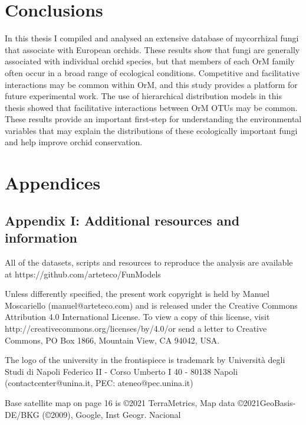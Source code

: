 \part{Conclusions}
\label{conclusions}

In this thesis I compiled and analysed an extensive database of mycorrhizal fungi that associate with European orchids. These results show that fungi are generally associated with individual orchid species, but that members of each OrM family often occur in a broad range of ecological conditions. Competitive and facilitative interactions may be common within OrM, and this study provides a platform for future experimental work. The use of hierarchical distribution models in this thesis showed that facilitative interactions between OrM OTUs may be common. These results provide an important first-step for understanding the environmental variables that may explain the distributions of these ecologically important fungi and help improve orchid conservation.

\part{Appendices}
\label{appendices}

\chapter{Appendix I: Additional resources and information}
\label{appendixi:additionalresourcesandinformation}

All of the datasets, scripts and resources to reproduce the analysis are available at https:\slash \slash github.com\slash arteteco\slash FunModels

Unless differently specified, the present work copyright is held by Manuel Moscariello (manuel@arteteco.com) and is released under the Creative Commons Attribution 4.0 International License. To view a copy of this license, visit http:\slash \slash creativecommons.org\slash licenses\slash by\slash 4.0\slash  or send a letter to Creative Commons, PO Box 1866, Mountain View, CA 94042, USA.

The logo of the university in the frontispiece is trademark by Università degli Studi di Napoli Federico II - Corso Umberto I 40 - 80138 Napoli (contactcenter@unina.it, PEC: ateneo@pec.unina.it)

Base satellite map on page 16 is ©2021 TerraMetrics, Map data ©2021GeoBasis-DE\slash BKG (©2009), Google, Inst Geogr. Nacional

